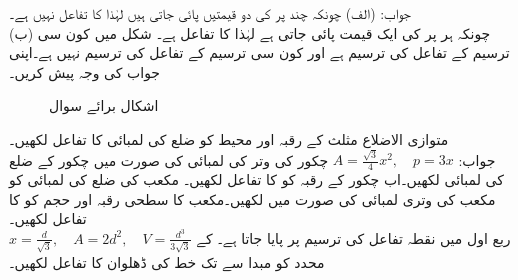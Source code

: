 جواب:\quad
(الف) چونکہ چند  پر  کی دو قیمتیں پائی جاتی ہیں لہٰذا  کا تفاعل نہیں ہے۔\\
(ب) چونکہ ہر  پر  کی ایک قیمت پائی جاتی ہے لہٰذا  کا تفاعل ہے۔
 شکل  میں کون سی ترسیم  کے تفاعل کی ترسیم ہے اور کون سی ترسیم  کے تفاعل کی ترسیم نہیں ہے۔اپنی جواب کی وجہ پیش کریں۔
\begin{figure}
\centering
\begin{subfigure}{0.5\textwidth}
\centering
{}
\end{subfigure}%
\begin{subfigure}{0.5\textwidth}
\centering
{}
\end{subfigure}%
\caption{اشکال برائے سوال }
\label{شکل_سوال_ابتدا_کیا_ترسیم_تفاعل_ہے_ب}
\end{figure}



متوازی الاضلاع مثلث کے رقبہ اور محیط کو ضلع کی لمبائی  کا تفاعل لکھیں۔\\
جواب:\quad
$A=\tfrac{\sqrt{3}}{4}x^2,\quad p=3x$
چکور کی وتر کی لمبائی  کی صورت میں چکور کے ضلع کی لمبائی لکھیں۔اب چکور کے رقبہ کو  کا تفاعل لکھیں۔
مکعب کی ضلع کی لمبائی کو مکعب کی وتری لمبائی  کی صورت میں لکھیں۔مکعب کا سطحی رقبہ اور حجم کو  کا تفاعل لکھیں۔ \\
$x=\tfrac{d}{\sqrt{3}},\quad A=2d^2,\quad V=\tfrac{d^3}{3\sqrt{3}}$
ربع اول میں نقطہ  تفاعل  کی ترسیم پر پایا جاتا ہے۔ کے محدد کو مبدا سے  تک خط کی ڈھلوان کا تفاعل لکھیں۔

